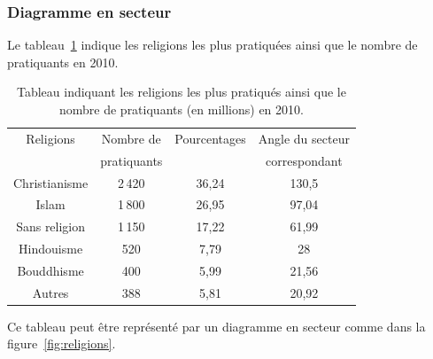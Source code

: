                   \subsubsection{Diagramme en secteur}
                        Le tableau~\ref{tab:religions} indique les religions les plus pratiqu\'ees
                        ainsi que le nombre de pratiquants en 2010.
                        
                        \begin{table}[h!]
                        \centering
                              \begin{tabular}{|c|c|c|c|}
                              \hline 
                              Religions & Nombre de   & Pourcentages & Angle du secteur \\ 
                                        & pratiquants &              &  correspondant   \\
                              \hline 
                              Christianisme & 2\,420 & 36,24 & 130,5 \\ 
                              \hline 
                              Islam & 1\,800 & 26,95 & 97,04 \\ 
                              \hline 
                              Sans religion & 1\,150 & 17,22 & 61,99 \\ 
                              \hline 
                              Hindouisme & 520 & 7,79 & 28 \\ 
                              \hline 
                              Bouddhisme & 400 & 5,99 & 21,56 \\ 
                              \hline 
                              Autres & 388 & 5,81 & 20,92 \\ 
                              \hline 
                              \end{tabular} 
                              \caption{Tableau indiquant les religions les plus pratiqu\'es 
                                       ainsi que le nombre de pratiquants (en millions) en 2010.}
                              \label{tab:religions}
                        \end{table}
                        Ce tableau peut \^etre repr\'esent\'e par un diagramme en secteur 
                        comme dans la figure~\ref{fig:religions}.
